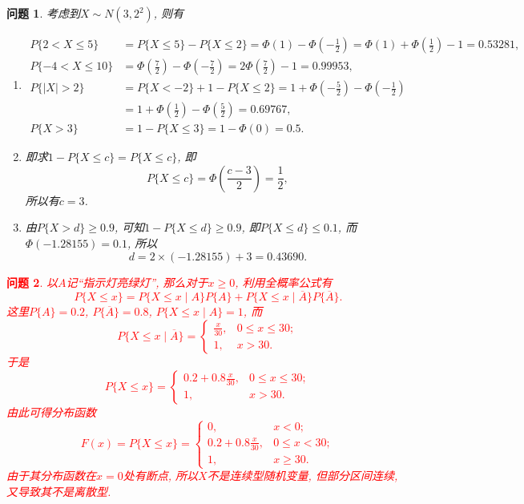 \documentclass[a4paper]{article}
\newcommand{\red}[1]{\textcolor{red}{#1}}
\newcommand{\disp}{\displaystyle}
\theoremstyle{mystyle}
\newtheorem{prob}{问题}[section]
\begin{document}
	\setcounter{prob}{25}
	\begin{prob}
		考虑到$X\sim N(3,2^2)$, 则有
		\begin{enumerate}[{(}1{)}]
			\item
			\begin{align*}
				P\{2<X\leqslant 5\}&=P\{X\leqslant 5\}-P\{X\leqslant 2\}=\varPhi(1)-\varPhi\left(-\frac{1}{2}\right)=\varPhi(1)+\varPhi\left(\frac{1}{2}\right)-1=0.53281,\\
				P\{-4<X\leqslant 10\}&=\varPhi\left(\frac{7}{2}\right)-\varPhi\left(-\frac{7}{2}\right)=2\varPhi\left(\frac{7}{2}\right)-1=0.99953,\\
				P\{|X|>2\}&=P\{X<-2\}+1-P\{X\leqslant 2\}=1+\varPhi\left(-\frac{5}{2}\right)-\varPhi\left(-\frac{1}{2}\right)\\
				&=1+\varPhi\left(\frac{1}{2}\right)-\varPhi\left(\frac{5}{2}\right)=0.69767,\\
				P\{X>3\}&=1-P\{X\leqslant 3\}=1-\varPhi(0)=0.5.
			\end{align*}
			\item
			即求$1-P\{X\leqslant c\}=P\{X\leqslant c\}$, 即
			\[
				P\{X\leqslant c\}=\varPhi\left(\frac{c-3}{2}\right)=\frac{1}{2},
			\]
			所以有$c=3$.
			\item
			由$P\{X>d\}\geqslant 0.9$, 可知$1-P\{X\leqslant d\}\geqslant 0.9$, 即$P\{X\leqslant d\}\leqslant 0.1$, 而$\varPhi(-1.28155)=0.1$, 所以
			\[
				d = 2\times(-1.28155) +3=0.43690.
			\]
		\end{enumerate}
	\end{prob}
	\setcounter{prob}{30}\red{
	\begin{prob}
		以$A$记``指示灯亮绿灯'', 那么对于$x\geqslant 0$, 利用全概率公式有
		\[
			P\{X\leqslant x\}=P\{X\leqslant x\mid A\}P\{A\}+P\{X\leqslant x\mid \overline{A}\}P\{\overline{A}\}.
		\]
		这里$P\{A\}=0.2$, $P\{\overline{A}\}=0.8$, $P\{X\leqslant x\mid A\}=1$, 而
		\[
			P\{X\leqslant x\mid \overline{A}\}=
			\begin{cases}
				\disp\frac{x}{30}, &0\leqslant x\leqslant 30;\\
				1,&x>30.
			\end{cases}
		\]
		于是
		\[
			P\{X\leqslant x\}=
			\begin{cases}
				\disp 0.2+0.8\frac{x}{30}, & 0\leqslant x\leqslant 30;\\
				1,&x>30.
			\end{cases}
		\]
		由此可得分布函数
		\[
			F(x)=P\{X\leqslant x\}=
			\begin{cases}
				0, & x<0;\\
				\disp 0.2+0.8\frac{x}{30}, & 0\leqslant x<30;\\
				1,& x\geqslant 30.
			\end{cases}
		\]
		由于其分布函数在$x=0$处有断点, 所以$X$不是连续型随机变量, 但部分区间连续, 又导致其不是离散型.
	\end{prob}}
\end{document}
